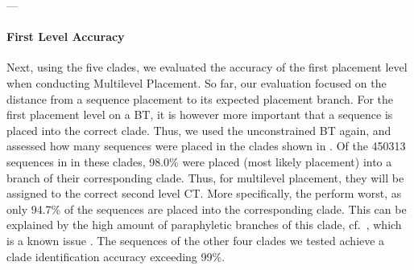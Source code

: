 ---


\paragraph{First Level Accuracy}
\label{ch:AutomaticTrees:sec:Evaluation:sub:MultilevelPlacement:par:FirstLevelAccuracy}

Next, using the five clades, we evaluated the accuracy of the first placement level when conducting Multilevel Placement.
So far, our evaluation focused on the distance from a sequence placement to its expected placement branch.
For the first placement level on a \acf{BT}, it is however more important that a sequence is placed into the correct clade.
Thus, we used the unconstrained  \ac{BT} again,
and assessed how many sequences were placed in the clades shown in .
Of the \num{450 313} sequences in  in these clades, %
98.0\% were placed (most likely placement) into a branch of their corresponding clade.
Thus, for multilevel placement, they will be assigned to the correct second level \acf{CT}.
More specifically, the  perform worst,
as only 94.7\% of the  sequences are placed into the corresponding clade.
This can be explained by the high amount of paraphyletic branches of this clade, cf.~,
which is a known issue \citep{Parks2018}. %
The sequences of the other four clades we tested achieve a clade identification accuracy exceeding 99\%.



